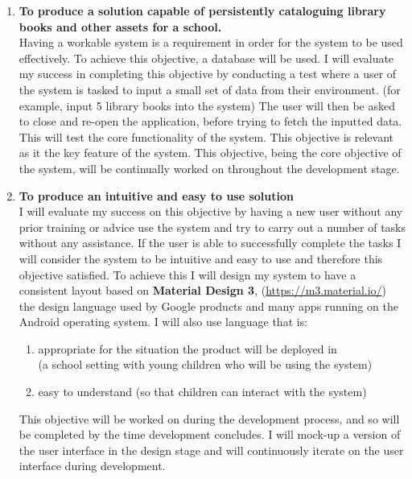 \documentclass[../../../main.tex]{subfiles}
\begin{document}
\begin{enumerate}
      \item \textbf{To produce a solution capable of persistently cataloguing library books and other assets for a school.}\\
            Having a workable system is a requirement in order for the system to be used effectively.
            To achieve this objective, a database will be used.
            I will evaluate my success in completing this objective by conducting a test where a user of the system is
            tasked to input a small set of data from their environment. (for example, input 5 library books into the system)
            The user will then be asked to close and re-open the application, before trying to fetch the inputted data.
            This will test the core functionality of the system. This objective is relevant as it the key feature of the system.
            This objective, being the core objective of the system, will be continually worked on throughout the development stage.

      \item \textbf{To produce an intuitive and easy to use solution}\\
            I will evaluate my success on this objective by having a new user without any prior training or advice use the system and
            try to carry out a number of tasks without any assistance. If the user is able to successfully complete the tasks
            I will consider the system to be intuitive and easy to use and therefore this objective satisfied.
            To achieve this I will design my system to have a consistent layout based on \textbf{Material Design 3}, (\url{https://m3.material.io/})
            the design language used by Google products and many apps running on the Android operating system.
            I will also use language that is:
            \begin{enumerate}
                  \item appropriate for the situation the product will be deployed in\\(a school setting with young children who will be using the system)
                  \item easy to understand (so that children can interact with the system)
            \end{enumerate}

            This objective will be worked on during the development process, and so will be
            completed by the time development concludes. I will mock-up a version of the
            user interface in the design stage and will continuously iterate on the
            user interface during development.


\end{enumerate}
\end{document}
